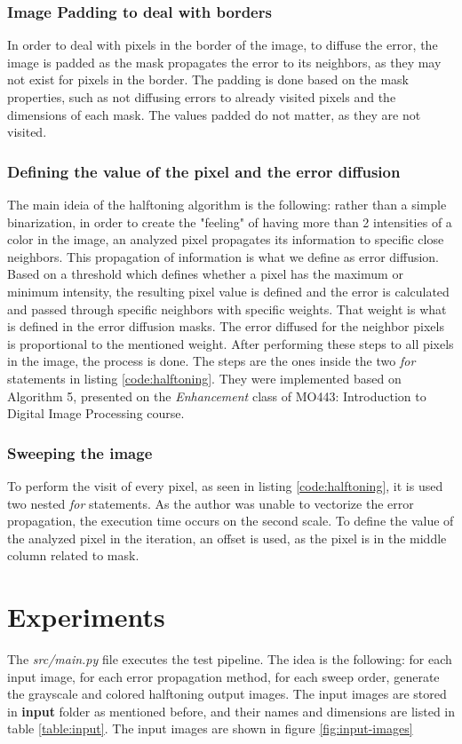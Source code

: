 \documentclass[]{IEEEtran}
\begin{document}
\subsubsection{Image Padding to deal with borders}
In order to deal with pixels in the border of the image, to diffuse the error, the image is padded as the mask propagates the error to its neighbors, as they may not exist for pixels in the border. The padding is done based on the mask properties, such as not diffusing errors to already visited pixels and the dimensions of each mask. The values padded do not matter, as they are not visited.

\subsubsection{Defining the value of the pixel and the error diffusion}
The main ideia of the halftoning algorithm is the following: rather than a simple binarization, in order to create the "feeling" of having more than 2 intensities of a color in the image, an analyzed pixel propagates its information to specific close neighbors. This propagation of information is what we define as error diffusion. Based on a threshold which defines whether a pixel has the maximum or minimum intensity, the resulting pixel value is defined and the error is calculated and passed through specific neighbors with specific weights. That weight is what is defined in the error diffusion masks. The error diffused for the neighbor pixels is proportional to the mentioned weight. After performing these steps to all pixels in the image, the process is done. The steps are the ones inside the two \textit{for} statements in listing \ref{code:halftoning}. They were implemented based on Algorithm 5, presented on the \textit{Enhancement} class of MO443: Introduction to Digital Image Processing course\cite{CLASS:1}.  

\subsubsection{Sweeping the image}
To perform the visit of every pixel, as seen in listing \ref{code:halftoning}, it is used two nested \textit{for} statements. As the author was unable to vectorize the error propagation, the execution time occurs on the second scale. To define the value of the analyzed pixel in the iteration, an  offset is used, as the pixel is in the middle column related to mask.

\section{Experiments}
The \textit{src/main.py} file executes the test pipeline. The idea is the following: for each input image, for each error propagation method, for each sweep order, generate the grayscale and colored halftoning output images. The input images are stored in \textbf{input} folder as mentioned before, and their names and dimensions are listed in table \ref{table:input}. The input images are shown in figure \ref{fig:input-images}
\end{document}
